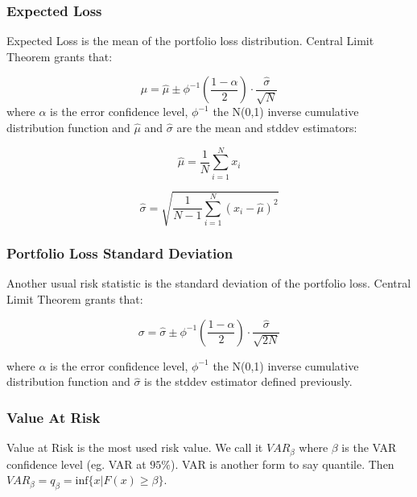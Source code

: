 \documentclass[a4paper,12pt,final]{article}
\begin{document}
\subsubsection{Expected Loss}
Expected Loss is the mean of the portfolio loss distribution.
Central Limit Theorem \cite{stats:schaum} grants that:

\begin{displaymath}
\mu = \widehat{\mu} \pm \phi^{-1}\left(\frac{1-\alpha}{2}\right) \cdot \frac{\widehat{\sigma}}{\sqrt{N}}
\end{displaymath}
where $\alpha$ is the error confidence level, $\phi^{-1}$ the N(0,1) inverse 
cumulative distribution function and $\widehat{\mu}$ and $\widehat{\sigma}$ are 
the mean and stddev estimators:

\begin{displaymath}
\widehat{\mu} = \frac{1}{N} \sum_{i=1}^{N} x_i
\end{displaymath}

\begin{displaymath}
\widehat{\sigma} =
\sqrt{\frac{1}{N-1} \sum_{i=1}^{N} \left( x_i - \widehat{\mu} \right)^2}
\end{displaymath}

\subsubsection{Portfolio Loss Standard Deviation}
Another usual risk statistic is the standard deviation of the portfolio loss.
Central Limit Theorem \cite{stats:schaum} grants that:

\begin{displaymath}
\sigma = \widehat{\sigma} \pm \phi^{-1}\left(\frac{1-\alpha}{2}\right) \cdot \frac{\widehat{\sigma}}{\sqrt{2N}}
\end{displaymath}

where $\alpha$ is the error confidence level, $\phi^{-1}$ the N(0,1) inverse 
cumulative distribution function and $\widehat{\sigma}$ is the stddev estimator
defined previously.

\subsubsection{Value At Risk}
Value at Risk \cite{var:jorion} is the most used risk value. We call it 
$VAR_{\beta}$ where $\beta$ is the VAR confidence level (eg. VAR at $95\%$).
VAR is another form to say quantile. Then
$VAR_{\beta} = q_{\beta} = \textrm{inf}\{x | F(x) \geq \beta \}$. 
\end{document}
